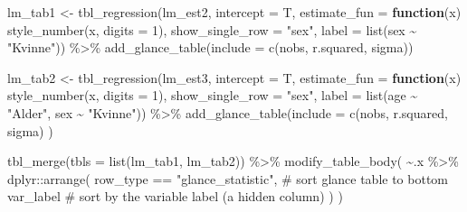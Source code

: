 \documentclass[
  norsk,
  letterpaper,
  DIV=11,
  numbers=noendperiod]{scrreprt}
\newenvironment{Shaded}{\begin{snugshade}}{\end{snugshade}}
\newcommand{\AttributeTok}[1]{\textcolor[rgb]{0.40,0.45,0.13}{#1}}
\newcommand{\CommentTok}[1]{\textcolor[rgb]{0.37,0.37,0.37}{#1}}
\newcommand{\ControlFlowTok}[1]{\textcolor[rgb]{0.00,0.23,0.31}{\textbf{#1}}}
\newcommand{\DecValTok}[1]{\textcolor[rgb]{0.68,0.00,0.00}{#1}}
\newcommand{\FunctionTok}[1]{\textcolor[rgb]{0.28,0.35,0.67}{#1}}
\newcommand{\NormalTok}[1]{\textcolor[rgb]{0.00,0.23,0.31}{#1}}
\newcommand{\OtherTok}[1]{\textcolor[rgb]{0.00,0.23,0.31}{#1}}
\newcommand{\SpecialCharTok}[1]{\textcolor[rgb]{0.37,0.37,0.37}{#1}}
\newcommand{\StringTok}[1]{\textcolor[rgb]{0.13,0.47,0.30}{#1}}
\theoremstyle{definition}
\theoremstyle{remark}
\begin{document}
\begin{Shaded}
\begin{Highlighting}[]
\NormalTok{lm\_tab1 }\OtherTok{\textless{}{-}} \FunctionTok{tbl\_regression}\NormalTok{(lm\_est2, }\AttributeTok{intercept =}\NormalTok{ T, }
                          \AttributeTok{estimate\_fun =} \ControlFlowTok{function}\NormalTok{(x) }\FunctionTok{style\_number}\NormalTok{(x, }\AttributeTok{digits =} \DecValTok{1}\NormalTok{),}
                          \AttributeTok{show\_single\_row =} \StringTok{"sex"}\NormalTok{,}
                          \AttributeTok{label =} \FunctionTok{list}\NormalTok{(sex }\SpecialCharTok{\textasciitilde{}} \StringTok{"Kvinne"}\NormalTok{)) }\SpecialCharTok{\%\textgreater{}\%} 
    \FunctionTok{add\_glance\_table}\NormalTok{(}\AttributeTok{include =} \FunctionTok{c}\NormalTok{(nobs, r.squared, sigma))}
                     
\NormalTok{lm\_tab2 }\OtherTok{\textless{}{-}} \FunctionTok{tbl\_regression}\NormalTok{(lm\_est3, }\AttributeTok{intercept =}\NormalTok{ T,}
                          \AttributeTok{estimate\_fun =} \ControlFlowTok{function}\NormalTok{(x) }\FunctionTok{style\_number}\NormalTok{(x, }\AttributeTok{digits =} \DecValTok{1}\NormalTok{), }
                          \AttributeTok{show\_single\_row =} \StringTok{"sex"}\NormalTok{,}
                          \AttributeTok{label =} \FunctionTok{list}\NormalTok{(age }\SpecialCharTok{\textasciitilde{}} \StringTok{"Alder"}\NormalTok{, sex }\SpecialCharTok{\textasciitilde{}} \StringTok{"Kvinne"}\NormalTok{)) }\SpecialCharTok{\%\textgreater{}\%} 
    \FunctionTok{add\_glance\_table}\NormalTok{(}\AttributeTok{include =} \FunctionTok{c}\NormalTok{(nobs, r.squared, sigma)}
\NormalTok{  )}


\FunctionTok{tbl\_merge}\NormalTok{(}\AttributeTok{tbls =} \FunctionTok{list}\NormalTok{(lm\_tab1, lm\_tab2)) }\SpecialCharTok{\%\textgreater{}\%} 
  \FunctionTok{modify\_table\_body}\NormalTok{(}
    \SpecialCharTok{\textasciitilde{}}\NormalTok{.x }\SpecialCharTok{\%\textgreater{}\%} 
\NormalTok{      dplyr}\SpecialCharTok{::}\FunctionTok{arrange}\NormalTok{(}
\NormalTok{        row\_type }\SpecialCharTok{==} \StringTok{"glance\_statistic"}\NormalTok{, }\CommentTok{\# sort glance table to bottom}
\NormalTok{        var\_label                       }\CommentTok{\# sort by the variable label (a hidden column) }
\NormalTok{      )}
\NormalTok{  )}
\end{Highlighting}
\end{Shaded}
\end{document}
